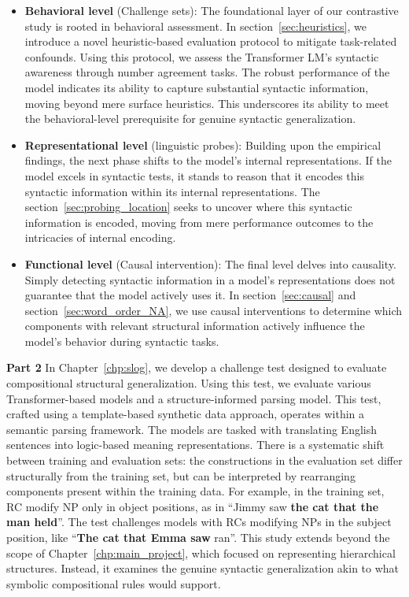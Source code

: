 \vspace{-0.8\baselineskip}
\begin{itemize}
    \item \textbf{Behavioral level} (Challenge sets): The foundational layer of our contrastive study is rooted in behavioral assessment. In section~\ref{sec:heuristics}, we introduce a novel heuristic-based evaluation protocol to mitigate task-related confounds. Using this protocol, we assess the Transformer LM's syntactic awareness through number agreement tasks. The robust performance of the model indicates its ability to capture substantial syntactic information, moving beyond mere surface heuristics. This underscores its ability to meet the behavioral-level prerequisite for genuine syntactic generalization.

    \item \textbf{Representational level} (linguistic probes): Building upon the empirical findings, the next phase shifts to the model's internal representations. If the model excels in syntactic tests, it stands to reason that it encodes this syntactic information within its internal representations. The section~\ref{sec:probing_location} seeks to uncover where this syntactic information is encoded, moving from mere performance outcomes to the intricacies of internal encoding.
    \item \textbf{Functional level} (Causal intervention): The final level delves into causality. Simply detecting syntactic information in a model's representations does not guarantee that the model actively uses it. 
    In section~\ref{sec:causal} and section~\ref{sec:word_order_NA}, we use causal interventions to determine which components with relevant structural information actively influence the model's behavior during syntactic tasks.
\end{itemize}

 
\noindent \textbf{Part 2 }  In Chapter~\ref{chp:slog}, we develop a challenge test designed to evaluate compositional structural generalization. Using this test, we evaluate various Transformer-based models and a structure-informed parsing model. 
This test, crafted using a template-based synthetic data approach,  operates within a semantic parsing framework. The models are tasked with
translating English sentences into logic-based meaning representations. There is a systematic shift between training and evaluation sets: the constructions in the evaluation set differ structurally from the training set, but can be interpreted by rearranging components present within the training data. For example, in the training set, \ac{RC} modify \ac{NP} only in object positions, as in ``Jimmy saw \textbf{the cat that the man held}''. The test challenges models with RCs modifying NPs in the subject position, like ``\textbf{The cat that Emma saw} ran''. This study extends beyond the scope of Chapter~\ref{chp:main_project}, which focused on representing hierarchical structures. Instead, it examines the genuine syntactic generalization akin to what symbolic compositional rules would support.   




